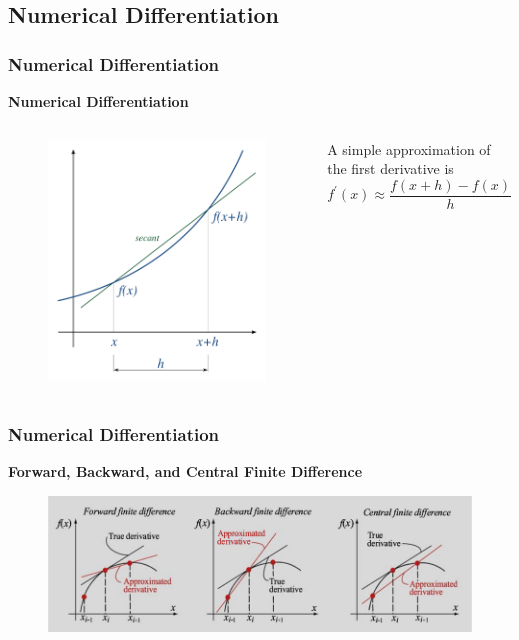 \documentclass{beamer}
\begin{document}
\subsection{Numerical Differentiation}
\begin{frame}
\frametitle{Numerical Differentiation}
\textbf{Numerical Differentiation}
\begin{columns}[c]
\begin{figure}
\centering
\includegraphics[scale=0.12]{diff.png}
\end{figure}
A simple approximation of the first derivative is
\begin{equation*}
f^{\prime}(x) \approx \frac{f(x+h)-f(x)}{h}
\end{equation*}
\end{columns}


\end{frame}
\begin{frame}
\frametitle{Numerical Differentiation}
\textbf{Forward, Backward, and Central Finite Difference}
\begin{figure}
\centering
\includegraphics[scale=0.35]{fint.png}
\end{figure}
\end{frame}
\end{document}
